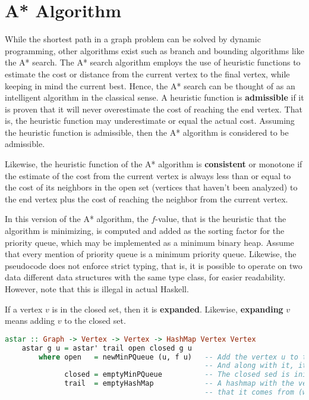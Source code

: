 \section{A* Algorithm}
While the shortest path in a graph problem can be solved by dynamic programming, other algorithms exist such as branch and bounding algorithms 
like the A* search.\cite{HartNilssonRaphael1968} The A* search algorithm employs the use of heuristic functions to estimate the cost
or distance from the current vertex to the final vertex, while keeping in mind the current best. Hence, the A* search can be thought of 
as an intelligent algorithm in the classical sense. A heuristic function is \textbf{admissible} if it is proven that it will never 
overestimate the cost of reaching the end vertex. That is, the heuristic function may underestimate or equal the actual cost. 
Assuming the heuristic function is admissible, then the A* algorithm is considered to be admissible. 

Likewise, the heuristic function of the A* algorithm is \textbf{consistent} or monotone if the estimate of the cost from the current 
vertex is always less than or equal to the cost of its neighbors in the open set (vertices that haven't been analyzed) to the end vertex
plus the cost of reaching the neighbor from the current vertex.

In this version of the A* algorithm, the $f$-value, that is the heuristic that the algorithm is minimizing,
is computed and added as the sorting factor for the priority queue, which may be implemented as a minimum binary heap.
Assume that every mention of priority queue is a minimum priority queue. Likewise, the pseudocode does not enforce 
strict typing, that is, it is possible to operate on two data different data structures with the same type class, for easier 
readability. However, note that this is illegal in actual Haskell.

\begin{definition}
    If a vertex $v$ is in the closed set, then it is \textbf{expanded}. Likewise, \textbf{expanding} $v$ means adding $v$ to the closed set.
\end{definition}


\begin{lstlisting}[language=Haskell, caption=A* Pseudocode]
    astar :: Graph -> Vertex -> Vertex -> HashMap Vertex Vertex 
    astar g u = astar' trail open closed g u
        where open   = newMinPQueue (u, f u)   -- Add the vertex u to the priority queue 
                                               -- And along with it, its heuristic f-value
              closed = emptyMinPQueue          -- The closed sed is initially empty.
              trail  = emptyHashMap            -- A hashmap with the vertex as the key and its value will be the vertex 
                                               -- that it comes from (with respect to the start vertex)
\end{lstlisting}

